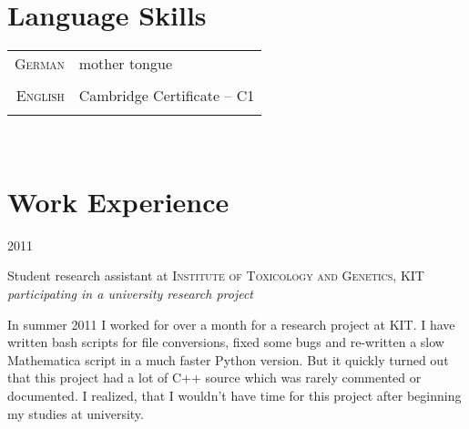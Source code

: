 \documentclass[a4paper,10pt]{article} %
\begin{document}
{\begin{minipage}[t]{0.44\textwidth}
\section{Language Skills}

\begin{tabular}{rl}
\textsc{German}
& mother tongue\\
& \\
\textsc{English}
& Cambridge Certificate – C1\\
& \\
\end{tabular}\\[10pt]


\end{minipage} %

\begin{minipage}[t]{0.5\textwidth}
\vspace{0pt} %


\section{Work Experience}

{\raggedleft\textsc{2011}\par}

{\raggedright\large Student research assistant at \textsc{ Institute of Toxicology and Genetics}, KIT\\
\textit{participating in a university research project}\\[5pt]}

\normalsize{In summer 2011 I worked for over a month for a
research project at KIT. I have written bash scripts for file
conversions, fixed some bugs and re-written a slow Mathematica script
in a much faster Python version. But it quickly turned out that
this project had a lot of C++ source which was rarely commented or
documented. I realized, that I wouldn't have time for this project
after beginning my studies at university.}\\


\end{minipage}}
\end{document}
